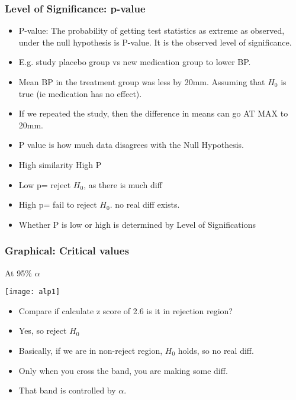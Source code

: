 \begin{frame}[fragile]\frametitle{Level of Significance: p-value}
\begin{itemize}


\item P-value:  The  probability  of  getting  test  statistics  as  extreme  as 
observed, under the null hypothesis is P-value. It is the observed 
level of significance. 
 
\item E.g. study placebo group vs new medication group to lower BP.  
\item Mean BP in the treatment group was less by 20mm. Assuming that $H_0$ is true (ie medication has no effect). 
\item If we repeated the study, then the difference in means can go AT MAX to 20mm.
\item P value is how much data disagrees with the Null Hypothesis.
\item  High similarity High P
\item Low p= reject $H_0$, as there is much diff
\item High p= fail to reject $H_0$. no real diff exists.
\item Whether P is low or high is determined by Level of Significations
\end{itemize}
\end{frame}


\begin{frame}
\frametitle{Graphical: Critical values}
At 95\% $\alpha$
\begin{center}
\texttt{[image: alp1]}
\end{center}

\begin{itemize}
\item  Compare if calculate z score of 2.6 is it in rejection region? 
\item Yes, so reject $H_0$
\item Basically, if we are in non-reject region, $H_0$ holds, so no real diff.
\item Only when you cross the band, you are making some diff.
\item That band is controlled by $\alpha$.
\end{itemize}
\end{frame}

